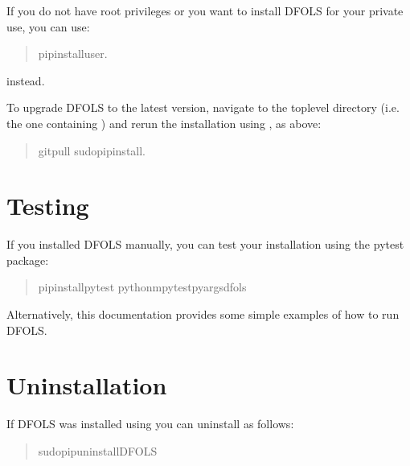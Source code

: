 \documentclass[letterpaper,10pt,english]{sphinxmanual}
\begin{document}
\sphinxAtStartPar
If you do not have root privileges or you want to install DFO\sphinxhyphen{}LS for your private use, you can use:
\begin{quote}

\begin{sphinxVerbatim}[commandchars=\\\{\}]
\PYGZdl{}pipinstall\PYGZhy{}\PYGZhy{}user.
\end{sphinxVerbatim}
\end{quote}

\sphinxAtStartPar
instead.

\sphinxAtStartPar
To upgrade DFO\sphinxhyphen{}LS to the latest version, navigate to the top\sphinxhyphen{}level directory (i.e. the one containing ) and rerun the installation using , as above:
\begin{quote}

\begin{sphinxVerbatim}[commandchars=\\\{\}]
\PYGZdl{}gitpull
\PYGZdl{}\PYG{o}{[}sudo\PYG{o}{]}pipinstall.
\end{sphinxVerbatim}
\end{quote}


\section{Testing}
\label{\detokenize{install:testing}}
\sphinxAtStartPar
If you installed DFO\sphinxhyphen{}LS manually, you can test your installation using the pytest package:
\begin{quote}

\begin{sphinxVerbatim}[commandchars=\\\{\}]
\PYGZdl{}pipinstallpytest
\PYGZdl{}python\PYGZhy{}mpytest\PYGZhy{}\PYGZhy{}pyargsdfols
\end{sphinxVerbatim}
\end{quote}

\sphinxAtStartPar
Alternatively, this documentation provides some simple examples of how to run DFO\sphinxhyphen{}LS.


\section{Uninstallation}
\label{\detokenize{install:uninstallation}}
\sphinxAtStartPar
If DFO\sphinxhyphen{}LS was installed using  you can uninstall as follows:
\begin{quote}

\begin{sphinxVerbatim}[commandchars=\\\{\}]
\PYGZdl{}\PYG{o}{[}sudo\PYG{o}{]}pipuninstallDFO\PYGZhy{}LS
\end{sphinxVerbatim}
\end{quote}
\end{document}
